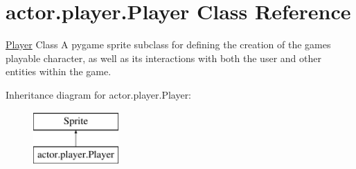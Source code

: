 \hypertarget{classactor_1_1player_1_1_player}{}\section{actor.\+player.\+Player Class Reference}
\label{classactor_1_1player_1_1_player}


\hyperlink{classactor_1_1player_1_1_player}{Player} Class  A pygame sprite subclass for defining the creation of the game\textquotesingle{}s playable character, as well as its interactions with both the user and other entities within the game.  


Inheritance diagram for actor.\+player.\+Player\+:\begin{figure}[H]
\begin{center}
\leavevmode
\includegraphics[height=2.000000cm]{classactor_1_1player_1_1_player}
\end{center}
\end{figure}
